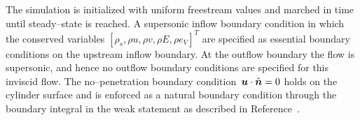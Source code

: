 
The simulation is initialized with uniform freestream values and marched in time until steady--state is reached.  A supersonic inflow boundary condition in which the conserved variables $\left[\rho_s, \rho u, \rho v, \rho E, \rho e_V\right]^T$ are specified as essential boundary conditions on the upstream inflow boundary. At the outflow boundary the flow is supersonic, and hence no outflow boundary conditions are specified for this inviscid flow.  The no--penetration boundary condition~${\boldsymbol{u}}\cdot\hat{{\boldsymbol{n}}}=0$ holds on the cylinder surface and is enforced as a natural boundary condition through the boundary integral in the weak statement as described in Reference~.

